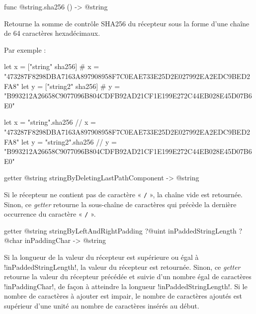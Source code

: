 \begin{galgas4box}
func @string.sha256 () -> @string
\end{galgas4box}

Retourne la somme de contrôle SHA256 du récepteur sous la forme d'une chaîne de 64 caractères hexadécimaux.

Par exemple :
\begin{galgas3}
  let x = ["string"  sha256]
    # x = "473287F8298DBA7163A897908958F7C0EAE733E25D2E027992EA2EDC9BED2FA8"
  let y = ["string2" sha256]
    # y = "B993212A26658C9077096B804CDFB92AD21CF1E199E272C44EB028E45D07B6E0"
\end{galgas3}

\begin{galgas4}
  let x = "string".sha256
   // x = "473287F8298DBA7163A897908958F7C0EAE733E25D2E027992EA2EDC9BED2FA8"
  let y = "string2".sha256
   // y = "B993212A26658C9077096B804CDFB92AD21CF1E199E272C44EB028E45D07B6E0"
\end{galgas4}










\begin{galgas3box}
getter @string stringByDeletingLastPathComponent -> @string
\end{galgas3box}

Si le récepteur ne contient pas de caractère « \texttt{/} », la chaîne vide est retournée. Sinon, ce \emph{getter} retourne la sous-chaîne de caractères qui précède la dernière occurrence du caractère « \texttt{/} ».








\begin{galgas3box}
getter @string stringByLeftAndRightPadding
   ?@uint inPaddedStringLength
   ?@char inPaddingChar -> @string
\end{galgas3box}

Si la longueur de la valeur du récepteur est supérieure ou égal à \ggst!inPaddedStringLength!, la valeur du récepteur est retournée. Sinon, ce \emph{getter} retourne la valeur du récepteur précédée et suivie d'un nombre égal de caractères \ggst!inPaddingChar!, de façon à atteindre la longueur \ggst!inPaddedStringLength!. Si le nombre de caractères à ajouter est impair, le nombre de caractères ajoutés est supérieur d'une unité au nombre de caractères insérés au début.








